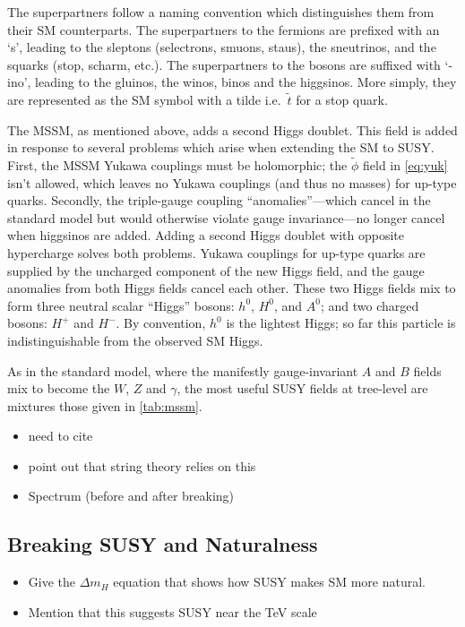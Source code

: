 The superpartners follow a naming convention which distinguishes them from their SM counterparts. The superpartners to the fermions are prefixed with an `s', leading to the sleptons (selectrons, smuons, staus), the sneutrinos, and the squarks (stop, scharm, etc.). The superpartners to the bosons are suffixed with `-ino', leading to the gluinos, the winos, binos and the higgsinos. More simply, they are represented as the SM symbol with a tilde i.e.~$\tilde{t}$ for a stop quark.

The MSSM, as mentioned above, adds a second Higgs doublet. This field is added in response to several problems which arise when extending the SM to SUSY. First, the MSSM Yukawa couplings must be holomorphic; the $\tilde{\phi}$ field in \cref{eq:yuk} isn't allowed, which leaves no Yukawa couplings (and thus no masses) for up-type quarks. Secondly, the triple-gauge coupling ``anomalies''---which cancel in the standard model but would otherwise violate gauge invariance---no longer cancel when higgsinos are added. Adding a second Higgs doublet with opposite hypercharge solves both problems. Yukawa couplings for up-type quarks are supplied by the uncharged component of the new Higgs field, and the gauge anomalies from both Higgs fields cancel each other. These two Higgs fields mix to form three neutral scalar ``Higgs'' bosons: $h^0$, $H^0$, and $A^0$; and two charged bosons: $H^+$ and $H^-$. By convention, $h^0$ is the lightest Higgs; so far this particle is indistinguishable from the observed SM Higgs.

As in the standard model, where the manifestly gauge-invariant $A$ and $B$ fields mix to become the $W$, $Z$ and $\gamma$, the most useful SUSY fields at tree-level are mixtures those given in \cref{tab:mssm}. %

\begin{itemize}
\item need to cite~\cite{light-squarks}
\item point out that string theory relies on this
\item Spectrum (before and after breaking)
\end{itemize}

\subsection{Breaking SUSY and Naturalness}
\begin{itemize}
\item Give the $\Delta m_{H}$ equation that shows how SUSY makes SM more natural.
\item Mention that this suggests SUSY near the TeV scale
\end{itemize}
